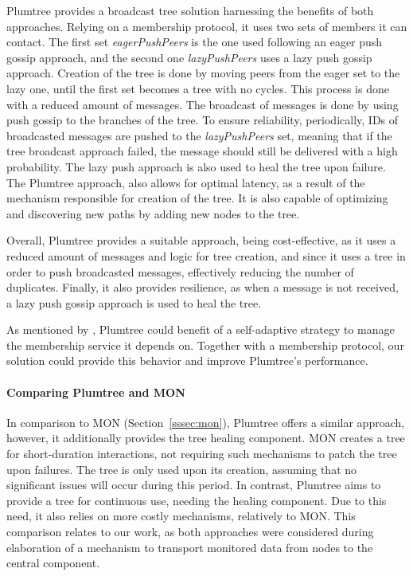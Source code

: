 Plumtree\cite{Leitao2007a} provides a broadcast tree solution harnessing the benefits of both approaches. Relying on a membership protocol, it uses two sets of members it can contact. The first set \textit{eagerPushPeers} is the one used following an eager push gossip approach, and the second one \textit{lazyPushPeers} uses a lazy push gossip approach. Creation of the tree is done by moving peers from the eager set to the lazy one, until the first set becomes a tree with no cycles. This process is done with a reduced amount of messages. The broadcast of messages is done by using push gossip to the branches of the tree. To ensure reliability, periodically, IDs of broadcasted messages are pushed to the \textit{lazyPushPeers} set, meaning that if the tree broadcast approach failed, the message should still be delivered with a high probability. The lazy push approach is also used to heal the tree upon failure. The Plumtree approach, also allows for optimal latency, as a result of the mechanism responsible for creation of the tree. It is also capable of optimizing and discovering new paths by adding new nodes to the tree.

Overall, Plumtree provides a suitable approach, being cost-effective, as it uses a reduced amount of messages and logic for tree creation, and since it uses a tree in order to push broadcasted messages, effectively reducing the number of duplicates. Finally, it also provides resilience, as when a message is not received, a lazy push gossip approach is used to heal the tree.

As mentioned by \cite{Leitao2007a}, Plumtree could benefit of a self-adaptive strategy to manage the membership service it depends on. Together with a membership protocol, our solution could provide this behavior and improve Plumtree's performance.

\paragraph{Comparing Plumtree and MON} \label{par:comparing_plumtree_and_mon} In comparison to MON (Section~\ref{sssec:mon}), Plumtree offers a similar approach, however, it additionally provides the tree healing component. MON creates a tree for short-duration interactions, not requiring such mechanisms to patch the tree upon failures. The tree is only used upon its creation, assuming that no significant issues will occur during this period. In contrast, Plumtree aims to provide a tree for continuous use, needing the healing component. Due to this need, it also relies on more costly mechanisms, relatively to MON. This comparison relates to our work, as both approaches were considered during elaboration of a mechanism to transport monitored data from nodes to the central component.

